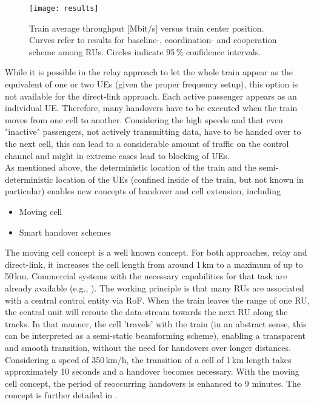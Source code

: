 \documentclass[a4paper,conference,twocolumn,10pt]{IEEEtran}
\begin{document}
\begin{figure}
	\centering
\texttt{[image: results]}
	\caption{Train average throughput [Mbit/s] versus train center position. Curves refer to results for baseline-, coordination- and cooperation scheme among \acp{RU}. Circles indicate 95\,\% confidence intervals.}
	\label{Fig:Sim_Results}
\end{figure}

While it is possible in the relay approach to let the whole train appear as the equivalent of one or two \acp{UE} (given the proper frequency setup), this option is not available for the direct-link approach. Each active passenger appears as an individual \ac{UE}. Therefore, many handovers have to be executed when the train moves from one cell to another. Considering the high speeds and that even "inactive" passengers, not actively transmitting data, have to be handed over to the next cell, this can lead to a considerable amount of traffic on the control channel and might in extreme cases lead to blocking of \acp{UE}.\\

As mentioned above, the deterministic location of the train and the semi-deterministic location of the UEs (confined inside of the train, but not known in particular) enables new concepts of handover and cell extension, including

\begin{itemize}
	\item Moving cell
	\item Smart handover schemes
\end{itemize}

The moving cell concept is a well known concept. For both approaches, relay and direct-link, it increases the cell length from around 1\,km to a maximum of up to 50\,km. Commercial systems with the necessary capabilities for that task are already available (e.g., \cite{kbow}). The working principle is that many \acp{RU} are associated with a central control entity via \ac{RoF}. When the train leaves the range of one \ac{RU}, the central unit will reroute the data-stream towards the next \ac{RU} along the tracks. In that manner, the cell 'travels' with the train (in an abstract sense, this can be interpreted as a semi-static beamforming scheme), enabling a transparent and smooth transition, without the need for handovers over longer distances. Considering a speed of 350\,km/h, the transition of a cell of 1\,km length takes approximately 10 seconds and a handover becomes necessary. With the moving cell concept, the period of reoccurring handovers is enhanced to 9 minutes. The concept is further detailed in \cite{917517}.\\
\end{document}
